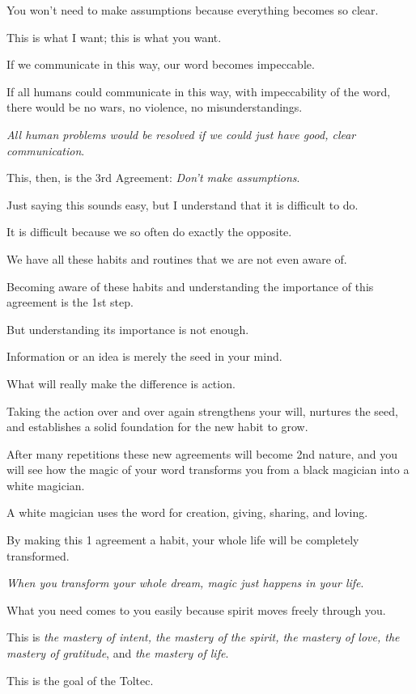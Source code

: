 \documentclass{article}
\numberwithin{equation}{section}
\begin{document}
You won't need to make assumptions because everything becomes so clear.

This is what I want; this is what you want.

If we communicate in this way, our word becomes impeccable.

If all humans could communicate in this way, with impeccability of the word, there would be no wars, no violence, no misunderstandings.

\textit{All human problems would be resolved if we could just have good, clear communication}.

%
This, then, is the 3rd Agreement: \textit{Don't make assumptions}.

Just saying this sounds easy, but I understand that it is difficult to do.

It is difficult because we so often do exactly the opposite.

We have all these habits and routines that we are not even aware of.

Becoming aware of these habits and understanding the importance of this agreement is the 1st step.

But understanding its importance is not enough.

Information or an idea is merely the seed in your mind.

What will really make the difference is action.

Taking the action over and over again strengthens your will, nurtures the seed, and establishes a solid foundation for the new habit to grow.

After many repetitions these new agreements will become 2nd nature, and you will see how the magic of your word transforms you from a black magician into a white magician.

%
A white magician uses the word for creation, giving, sharing, and loving.

By making this 1 agreement a habit, your whole life will be completely transformed.

%
\textit{When you transform your whole dream, magic just happens in your life}.

What you need comes to you easily because spirit moves freely through you.

This is \textit{the mastery of intent, the mastery of the spirit, the mastery of love, the mastery of gratitude}, and \textit{the mastery of life}.

This is the goal of the Toltec.
\end{document}
